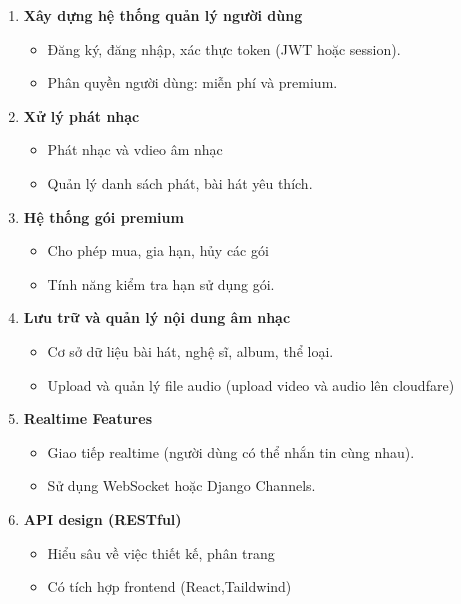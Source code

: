\documentclass{article}
\begin{document}
\begin{enumerate}
\def\labelenumi{\arabic{enumi}.}
\item
  \textbf{Xây dựng hệ thống quản lý người dùng\\
  }

  \begin{itemize}
  \item
    Đăng ký, đăng nhập, xác thực token (JWT hoặc session).
  \item
    Phân quyền người dùng: miễn phí và premium.
  \end{itemize}
\item
  \textbf{Xử lý phát nhạc\\
  }

  \begin{itemize}
  \item
    Phát nhạc và vdieo âm nhạc
  \item
    Quản lý danh sách phát, bài hát yêu thích.
  \end{itemize}
\item
  \textbf{Hệ thống gói premium\\
  }

  \begin{itemize}
  \item
    Cho phép mua, gia hạn, hủy các gói
  \item
    Tính năng kiểm tra hạn sử dụng gói.
  \end{itemize}
\item
  \textbf{Lưu trữ và quản lý nội dung âm nhạc\\
  }

  \begin{itemize}
  \item
    Cơ sở dữ liệu bài hát, nghệ sĩ, album, thể loại.
  \item
    Upload và quản lý file audio (upload video và audio lên cloudfare)
  \end{itemize}
\item
  \textbf{Realtime Features\\
  }

  \begin{itemize}
  \item
    Giao tiếp realtime (người dùng có thể nhắn tin cùng nhau).
  \item
    Sử dụng WebSocket hoặc Django Channels.
  \end{itemize}
\item
  \textbf{API design (RESTful)\\
  }

  \begin{itemize}
  \item
    Hiểu sâu về việc thiết kế, phân trang
  \item
    Có tích hợp frontend (React,Taildwind)
  \end{itemize}
\end{enumerate}
\end{document}
